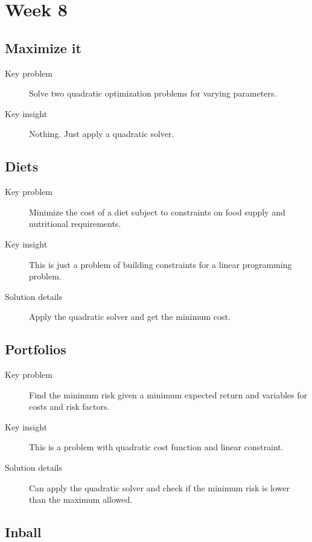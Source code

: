 \documentclass[11pt]{book}
\begin{document}
\section{Week 8}

\subsection{Maximize it}

\begin{description}
	\item[Key problem] Solve two quadratic optimization problems for varying parameters.
	\item[Key insight] Nothing. Just apply a quadratic solver.
\end{description}

\subsection{Diets}

\begin{description}
	\item[Key problem] Minimize the cost of a diet subject to constraints on food supply and nutritional requirements.
	\item[Key insight] This is just a problem of building constraints for a linear programming problem.
	\item[Solution details] Apply the quadratic solver and get the minimum cost.
\end{description}

\subsection{Portfolios}

\begin{description}
	\item[Key problem] Find the minimum risk given a minimum expected return and variables for costs and risk factors.
	\item[Key insight] This is a problem with quadratic cost function and linear constraint.
	\item[Solution details] Can apply the quadratic solver and check if the minimum risk is lower than the maximum allowed.
\end{description}

\subsection{Inball}
\end{document}
